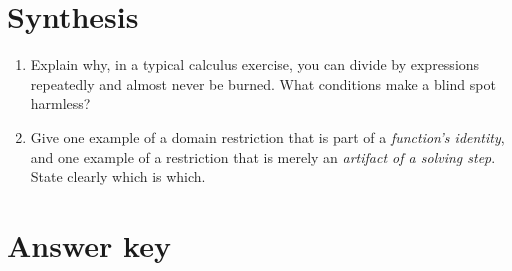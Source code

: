 \documentclass{essay}
\begin{document}
\section{Synthesis}

\begin{enumerate}[resume]

  \item Explain why, in a typical calculus exercise, you can divide by expressions repeatedly
    and almost never be burned. What conditions make a blind spot harmless?

  \item Give one example of a domain restriction that is part of a \emph{function's identity},
    and one example of a restriction that is merely an \emph{artifact of a solving step}. State
    clearly which is which.

\end{enumerate}

\newpage

\section*{Answer key}
\end{document}
